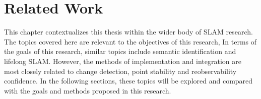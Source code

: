 \section{Related Work}
\label{sec:related_work}

This chapter contextualizes this thesis within the wider body of SLAM research. The topics covered here are relevant to the objectives of this research, 
In terms of the goals of this research, similar topics include semantic identification and lifelong SLAM. However, the methods of implementation and integration are most closely related to change detection, point stability and reobservability confidence. In the following sections, these topics will be explored and compared with the goals and methods proposed in this research.

% 